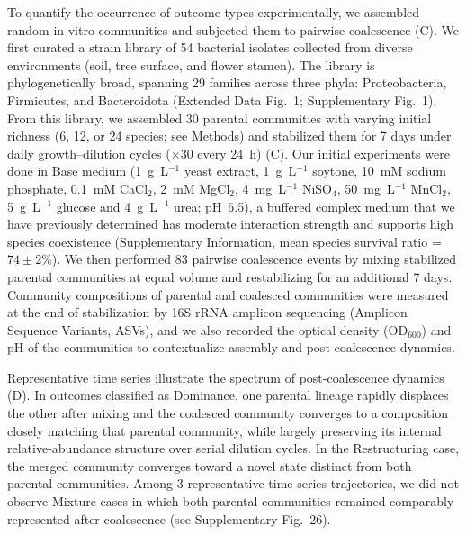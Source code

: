 To quantify the occurrence of outcome types experimentally, we assembled random in-vitro communities and subjected them to pairwise coalescence (C). We first curated a strain library of 54 bacterial isolates collected from diverse environments (soil, tree surface, and flower stamen). The library is phylogenetically broad, spanning 29 families across three phyla: Proteobacteria, Firmicutes, and Bacteroidota (Extended Data Fig.~1; Supplementary Fig.~1). From this library, we assembled 30 parental communities with varying initial richness (6, 12, or 24 species; see Methods) and stabilized them for 7 days under daily growth--dilution cycles ($\times$30 every 24~h) (C). Our initial experiments were done in Base medium (1~g~L$^{-1}$ yeast extract, 1~g~L$^{-1}$ soytone, 10~mM sodium phosphate, 0.1~mM CaCl$_2$, 2~mM MgCl$_2$, 4~mg~L$^{-1}$ NiSO$_4$, 50~mg~L$^{-1}$ MnCl$_2$, 5~g~L$^{-1}$ glucose and 4~g~L$^{-1}$ urea; pH~6.5), a buffered complex medium that we have previously determined has moderate interaction strength and supports high species coexistence (Supplementary Information, mean species survival ratio = $74 \pm 2$\%). We then performed 83 pairwise coalescence events by mixing stabilized parental communities at equal volume and restabilizing for an additional 7 days. Community compositions of parental and coalesced communities were measured at the end of stabilization by 16S rRNA amplicon sequencing (Amplicon Sequence Variants, ASVs), and we also recorded the optical density (OD$_{600}$) and pH of the communities to contextualize assembly and post-coalescence dynamics.

Representative time series illustrate the spectrum of post-coalescence dynamics (D). In outcomes classified as Dominance, one parental lineage rapidly displaces the other after mixing and the coalesced community converges to a composition closely matching that parental community, while largely preserving its internal relative-abundance structure over serial dilution cycles. In the Restructuring case, the merged community converges toward a novel state distinct from both parental communities. Among 3 representative time-series trajectories, we did not observe Mixture cases in which both parental communities remained comparably represented after coalescence (see Supplementary Fig.~26).


